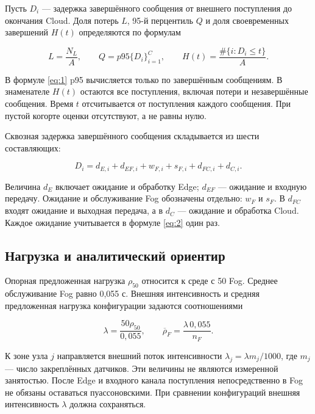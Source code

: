 Пусть \(D_i\) --- задержка завершённого сообщения от внешнего поступления до окончания Cloud. Доля потерь \(L\), 95-й перцентиль \(Q\) и доля своевременных завершений \(H(t)\) определяются по формулам

\begin{equation}\label{eq:1}
L=\frac{N_L}{A},\qquad Q=p95\{D_i\}_{i=1}^{C},\qquad
H(t)=\frac{\#\{i:D_i\leq t\}}{A}.
\end{equation}

В формуле \eqref{eq:1} p95 вычисляется только по завершённым сообщениям. В знаменателе \(H(t)\) остаются все поступления, включая потери и незавершённые сообщения. Время \(t\) отсчитывается от поступления каждого сообщения. При пустой когорте оценки отсутствуют, а не равны нулю.

Сквозная задержка завершённого сообщения складывается из шести составляющих:

\begin{equation}\label{eq:2}
D_i=d_{E,i}+d_{EF,i}+w_{F,i}+s_{F,i}+d_{FC,i}+d_{C,i}.
\end{equation}

Величина \(d_E\) включает ожидание и обработку Edge; \(d_{EF}\) --- ожидание и входную передачу. Ожидание и обслуживание Fog обозначены отдельно: \(w_F\) и \(s_F\). В \(d_{FC}\) входят ожидание и выходная передача, а в \(d_C\) --- ожидание и обработка Cloud. Каждое ожидание учитывается в формуле \eqref{eq:2} один раз.

\hypertarget{ux43dux430ux433ux440ux443ux437ux43aux430-ux438-ux430ux43dux430ux43bux438ux442ux438ux447ux435ux441ux43aux438ux439-ux43eux440ux438ux435ux43dux442ux438ux440}{%
\subsection{Нагрузка и аналитический ориентир}}

Опорная предложенная нагрузка \(\rho_{50}\) относится к среде с 50 Fog. Среднее обслуживание Fog равно 0,055 с. Внешняя интенсивность и средняя предложенная нагрузка конфигурации задаются соотношениями

\begin{equation}\label{eq:3}
\lambda=\frac{50\rho_{50}}{0{,}055},\qquad
\overline{\rho}_F=\frac{\lambda\,0{,}055}{n_F}.
\end{equation}

К зоне узла \(j\) направляется внешний поток интенсивности \(\lambda_j=\lambda m_j/1000\), где \(m_j\) --- число закреплённых датчиков. Эти величины не являются измеренной занятостью. После Edge и входного канала поступления непосредственно в Fog не обязаны оставаться пуассоновскими. При сравнении конфигураций внешняя интенсивность \(\lambda\) должна сохраняться.

